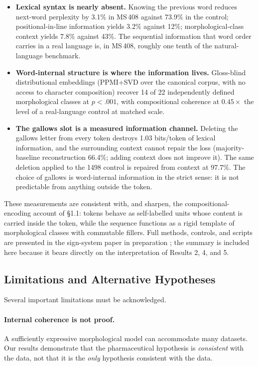 \documentclass[11pt,a4paper]{article}
\begin{document}
\begin{itemize}[leftmargin=*,itemsep=3pt]
\item \textbf{Lexical syntax is nearly absent.} Knowing the previous word reduces next-word perplexity by 3.1\% in MS\,408 against 73.9\% in the control; positional-in-line information yields 3.2\% against 12\%; morphological-class context yields 7.8\% against 43\%. The sequential information that word order carries in a real language is, in MS\,408, roughly one tenth of the natural-language benchmark.
\item \textbf{Word-internal structure is where the information lives.} Gloss-blind distributional embeddings (PPMI+SVD over the canonical corpus, with no access to character composition) recover 14 of 22 independently defined morphological classes at $p<.001$, with compositional coherence at $0.45\times$ the level of a real-language control at matched scale.
\item \textbf{The gallows slot is a measured information channel.} Deleting the gallows letter from every token destroys 1.03 bits/token of lexical information, and the surrounding context cannot repair the loss (majority-baseline reconstruction 66.4\%; adding context does not improve it). The same deletion applied to the 1498 control is repaired from context at 97.7\%. The choice of gallows is word-internal information in the strict sense: it is not predictable from anything outside the token.
\end{itemize}

These measurements are consistent with, and sharpen, the compositional-encoding account of \S1.1: tokens behave as self-labelled units whose content is carried inside the token, while the sequence functions as a rigid template of morphological classes with commutable fillers. Full methods, controls, and scripts are presented in the sign-system paper in preparation \citep{Placa2026c}; the summary is included here because it bears directly on the interpretation of Results 2, 4, and 5.

\subsection{Limitations and Alternative Hypotheses}

Several important limitations must be acknowledged.

\paragraph{Internal coherence is not proof.} A sufficiently expressive morphological model can accommodate many datasets. Our results demonstrate that the pharmaceutical hypothesis is \textit{consistent} with the data, not that it is the \textit{only} hypothesis consistent with the data.
\end{document}
